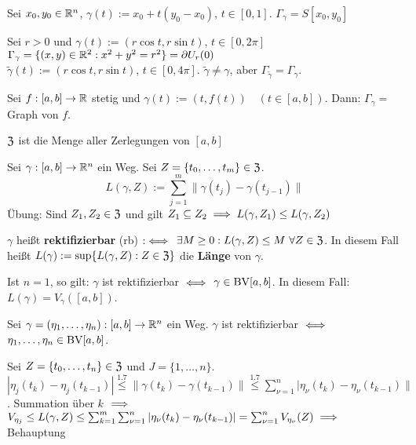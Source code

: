 \documentclass[a4paper,twoside,DIV15,BCOR12mm,chapterprefix=true,headings=twolinechapter]{scrbook}
\begin{document}
\begin{beispiele}
\item Sei $x_0, y_0\in\mathbb{R}^n$, $\gamma(t) := x_0 + t(y_0-x_0)$, $t\in[0,1]$. $\Gamma_\gamma=S[x_0,y_0]$
\item Sei $r>0$ und $\gamma(t) := (r \cos t, r \sin t)$, $t\in[0,2\pi]$\\ $\Gamma_\gamma=\{(x,y)\in\mathbb{R}^2: x^2+y^2=r^2\} = \partial U_r(0)$ \\
$\tilde\gamma(t) := (r \cos t, r \sin t)$, $t\in[0,4\pi]$. $\tilde\gamma \ne \gamma$, aber $\Gamma_{\tilde\gamma} = \Gamma_\gamma$.
\item Sei $f:[a,b] \to \mathbb{R}$ stetig und $\gamma(t) := (t, f(t)) \quad (t \in [a,b])$. Dann: $\Gamma_\gamma = $ Graph von $f$.
\end{beispiele}

\begin{erinnerung}
$\mathfrak{Z}$ ist die Menge aller Zerlegungen von $[a,b]$
\end{erinnerung}

\begin{definition}
Sei $\gamma:[a,b]\to \mathbb{R}^n$ ein Weg. Sei $Z=\{t_0, \ldots, t_m\} \in \mathfrak{Z}$.\\
$$L(\gamma,Z):= \sum_{j=1}^m\|\gamma(t_j) - \gamma(t_{j-1})\|$$
Übung: Sind $Z_1,Z_2\in\mathfrak{Z}$ und gilt $Z_1 \subseteq Z_2 \implies L(\gamma,Z_1) \le L(\gamma,Z_2)$

$\gamma$ heißt \textbf{rektifizierbar} (rb)  $:\iff$ $\exists M\ge0: L(\gamma,Z)\le M\ \forall Z\in\mathfrak{Z}$. In diesem Fall heißt $L(\gamma) := \sup\{L(\gamma,Z): Z\in\mathfrak{Z}\}$ die \textbf{Länge} von $\gamma$.

Ist $n=1$, so gilt: $\gamma$ ist rektifizierbar $\iff$ $\gamma\in \text{BV}[a,b]$. In diesem Fall: $L(\gamma) = V_\gamma([a,b])$.
\end{definition}

\begin{satz}
Sei $\gamma = (\eta_1, \ldots, \eta_n):[a,b]\to\mathbb{R}^n$ ein Weg. $\gamma$ ist rektifizierbar $\iff$ \mbox{$\eta_1,\ldots,\eta_n\in \text{BV}[a,b]$}.
\end{satz}

\begin{beweis}
Sei $Z = \{t_0,\ldots,t_n\} \in \mathfrak{Z}$ und $J=\{1,\ldots,n\}$.\\
$|\eta_j(t_k)-\eta_j(t_{k-1})| \stackrel{\text{1.7}}{\le} \|\gamma(t_k) - \gamma(t_{k-1})\| \stackrel{\text{1.7}}\le \sum_{\nu=1}^n |\eta_\nu(t_k) - \eta_\nu(t_{k-1})\|$. Summation über $k$ $\implies$ $V_{\eta_j} \le L(\gamma,Z) \le \sum_{k=1}^m\sum_{\nu=1}^n |\eta_\nu(t_k)-\eta_\nu(t_{k-1})| = \sum_{\nu=1}^n V_{\eta_\nu}(Z) \implies$ Behauptung
\end{beweis}
\end{document}
